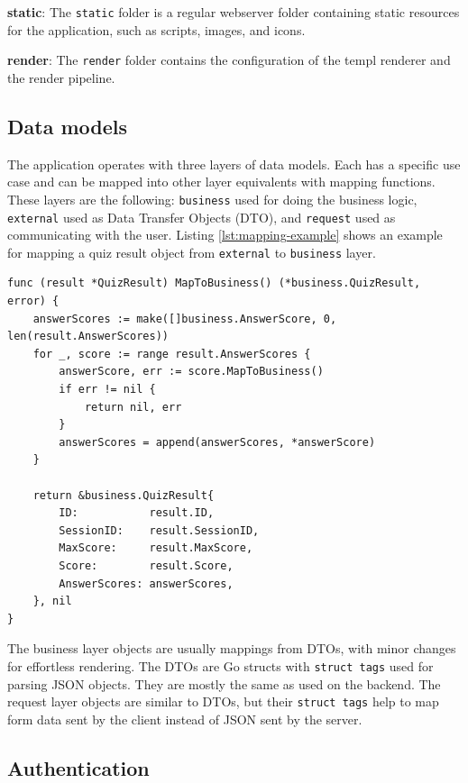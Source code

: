 \textbf{static}: The \texttt{static} folder is a regular webserver folder containing static resources for the application, such as scripts, images, and icons.

\textbf{render}: The \texttt{render} folder contains the configuration of the templ renderer and the render pipeline.

\subsection{Data models}

The application operates with three layers of data models. Each has a specific use case and can be mapped into other layer equivalents with mapping functions. These layers are the following: \texttt{business} used for doing the business logic, \texttt{external} used as Data Transfer Objects (DTO), and \texttt{request} used as communicating with the user. Listing \ref{lst:mapping-example} shows an example for mapping a quiz result object from \texttt{external} to \texttt{business} layer.

\begin{lstlisting}[caption=Mapping from external to business,label=lst:mapping-example]
func (result *QuizResult) MapToBusiness() (*business.QuizResult, error) {
    answerScores := make([]business.AnswerScore, 0, len(result.AnswerScores))
    for _, score := range result.AnswerScores {
        answerScore, err := score.MapToBusiness()
        if err != nil {
            return nil, err
        }
        answerScores = append(answerScores, *answerScore)
    }

    return &business.QuizResult{
        ID:           result.ID,
        SessionID:    result.SessionID,
        MaxScore:     result.MaxScore,
        Score:        result.Score,
        AnswerScores: answerScores,
    }, nil
}
\end{lstlisting}

The business layer objects are usually mappings from DTOs, with minor changes for effortless rendering. The DTOs are Go structs with \texttt{struct tags} used for parsing JSON objects. They are mostly the same as used on the backend. The request layer objects are similar to DTOs, but their \texttt{struct tags} help to map form data sent by the client instead of JSON sent by the server.

\subsection{Authentication}\label{subsec:frontend-authentication}


